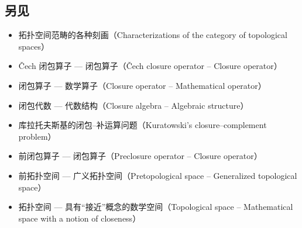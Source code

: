 \subsection{另见}
\begin{itemize}
  \item 拓扑空间范畴的各种刻画（Characterizations of the category of topological spaces）
  \item Čech 闭包算子 — 闭包算子（Čech closure operator – Closure operator）
  \item 闭包算子 — 数学算子（Closure operator – Mathematical operator）
  \item 闭包代数 — 代数结构（Closure algebra – Algebraic structure）
  \item 库拉托夫斯基的闭包–补运算问题（Kuratowski's closure–complement problem）
  \item 前闭包算子 — 闭包算子（Preclosure operator – Closure operator）
  \item 前拓扑空间 — 广义拓扑空间（Pretopological space – Generalized topological space）
  \item 拓扑空间 — 具有“接近”概念的数学空间（Topological space – Mathematical space with a notion of closeness）
\end{itemize}
